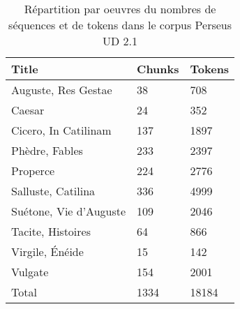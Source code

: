 \newpara


\begin{table}[]
\centering
\begin{tabular}{lll}
\toprule
 Title                  & Chunks & Tokens \\ \midrule
 Auguste, Res Gestae    & 38     & 708    \\
 Caesar                 & 24     & 352    \\
 Cicero, In Catilinam   & 137    & 1897   \\
 Phèdre, Fables         & 233    & 2397   \\
 Properce               & 224    & 2776   \\
 Salluste, Catilina     & 336    & 4999   \\
 Suétone, Vie d'Auguste & 109    & 2046   \\
 Tacite, Histoires      & 64     & 866    \\
 Virgile, Énéide        & 15     & 142    \\
 Vulgate                & 154    & 2001   \\ \midrule
 Total                  & 1334   & 18184  \\ \bottomrule
\hline
\end{tabular}
\label{table:perseus-ud:chunks-and-tokens}
\caption{Répartition par oeuvres du nombres de séquences et de tokens dans le corpus Perseus UD 2.1}
\end{table}

